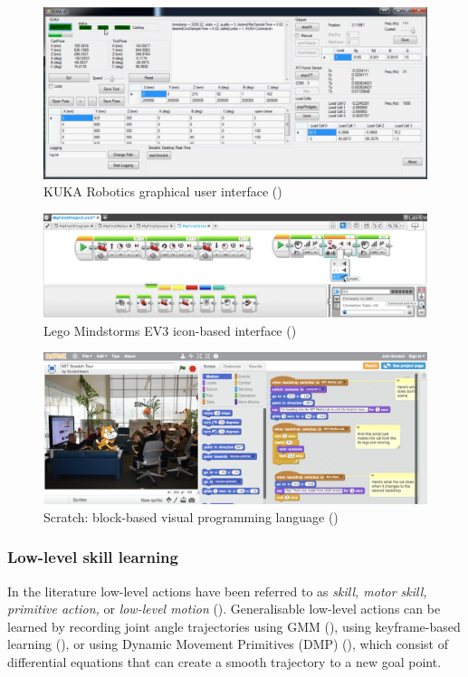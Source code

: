 \clearpage
\begin{figure}[!h]
	\centering
	\includegraphics[width=0.99\linewidth]{figures/kuka-interface2}
	\caption{KUKA Robotics graphical user interface (\cite{abdeetedal2017kuka})}
	\label{fig:Kuka}
\end{figure} 
\begin{figure}[!h]
	\centering
	\includegraphics[width=\linewidth]{figures/lego-mindstorm2}
	\caption{Lego Mindstorms EV3 icon-based interface (\cite{lego2003})}
	\label{fig:lego-mindstorm}
\end{figure} 
\begin{figure}[!h]
	\centering
	\includegraphics[width=\linewidth]{figures/scratch-interface}
	\caption{Scratch: block-based visual programming language (\cite{majed2014learn})}
	\label{fig:scratch-interface}
\end{figure} 
\clearpage
\subsubsection{Low-level skill learning}\label{ssec:lowlevel}
In the literature low-level actions have been referred to as \textit{skill, motor skill, primitive action,} or \textit{low-level motion} (\cite{chernova2014robot}).
Generalisable low-level actions can be learned by recording joint angle trajectories using GMM (\cite{billard2008robot}), using keyframe-based learning (\cite{akgun2012keyframe}), or using Dynamic Movement Primitives (DMP) (\cite{pastor2009learning}), which consist of differential equations that can create a smooth trajectory to a new goal point.

